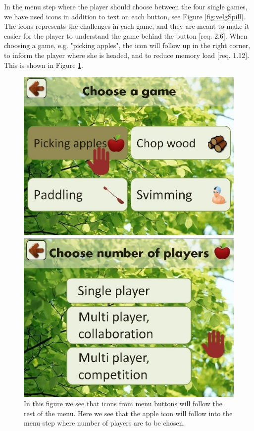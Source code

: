 In the menu step where the player should choose between the four single games, we have used icons in addition to text on each button, see Figure \ref{fig:velgSpill}. The icons represents the challenges in each game, and they are meant to make it easier for the player to understand the game behind the button [req. 2.6]. When choosing a game, e.g. "picking apples", the icon will follow up in the right corner, to inform the player where she is headed, and to reduce memory load [req. 1.12]. This is shown in Figure \ref{fig:iconEple}.  

\begin{figure} [H]
\centering
\includegraphics[scale=0.5]{menuIconApple.jpg}
\caption[Menu - use of icons]{In this figure we see that icons from menu buttons will follow the rest of the menu. Here we see that the apple icon will follow into the menu step where number of players are to be chosen.}
\label{fig:iconEple}
\end{figure} 
     
